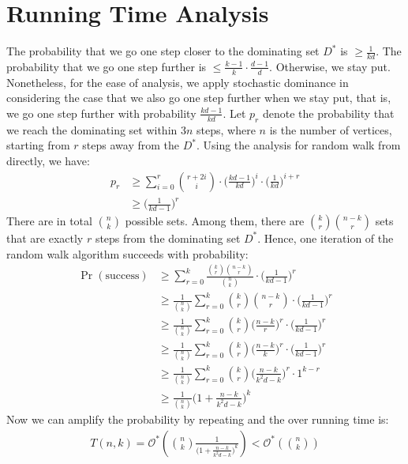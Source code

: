 \documentclass{article}
\begin{document}
\section{Running Time Analysis}
The probability that we go one step closer to the dominating set $D^*$ is $\geq \frac{1}{kd}$. The probability that we go one step further is $\leq \frac{k-1}{k} \cdot \frac{d-1}{d}$. Otherwise, we stay put. Nonetheless, for the ease of analysis, we apply stochastic dominance in considering the case that we also go one step further when we stay put, that is, we go one step further with probability $\frac{kd-1}{kd}$. Let $p_r$ denote the probability that we reach the dominating set within $3n$ steps, where $n$ is the number of vertices, starting from $r$ steps away from the $D^*$. Using the analysis  for random walk from \cite{Schoning99} directly, we have:
\begin{align*}
p_r &\geq \sum_{i = 0}^r {r+2i \choose i} \cdot \Big(\frac{kd-1}{kd}\Big)^i \cdot \Big(\frac{1}{kd}\Big)^{i+r} \\
&\geq \Big(\frac{1}{kd-1}\Big)^r
\end{align*}
There are in total ${n \choose k}$ possible sets. Among them, there are ${k \choose r}{n-k \choose r}$ sets that are exactly $r$ steps from the dominating set $D^*$. Hence, one iteration of the random walk algorithm succeeds with probability:
\begin{align*}
\Pr(\text{success}) &\geq \sum_{r = 0}^{k} \frac{{k \choose r}{n-k \choose r}}{{n \choose k}} \cdot \Big(\frac{1}{kd - 1}\Big)^r \\
&\geq \frac{1}{{n \choose k}} \sum_{r = 0}^k {k \choose r}{n-k \choose r} \cdot \Big(\frac{1}{kd - 1}\Big)^r \\
&\geq \frac{1}{{n \choose k}} \sum_{r = 0}^k {k \choose r}\Big(\frac{n-k}{r}\Big)^r \cdot \Big(\frac{1}{kd-1}\Big)^r \\
&\geq \frac{1}{{n \choose k}} \sum_{r = 0}^k {k \choose r}\Big(\frac{n-k}{k}\Big)^r \cdot \Big(\frac{1}{kd-1}\Big)^r \\
&\geq \frac{1}{{n \choose k}} \sum_{r = 0}^k {k \choose r} \Big(\frac{n-k}{k^2d - k}\Big)^r \cdot 1^{k-r} \\
&\geq \frac{1}{{n \choose k}} \Big(1 + \frac{n-k}{k^2d - k}\Big)^k
\end{align*}
Now we can amplify the probability by repeating and the over running time is:
\begin{align*}
T(n,k) = \mathcal{O}^*\left({n \choose k}\frac{1}{\Big(1 + \frac{n-k}{k^2d - k}\Big)^k}\right) < \mathcal{O}^*\left({n \choose k}\right)
\end{align*}
\end{document}
